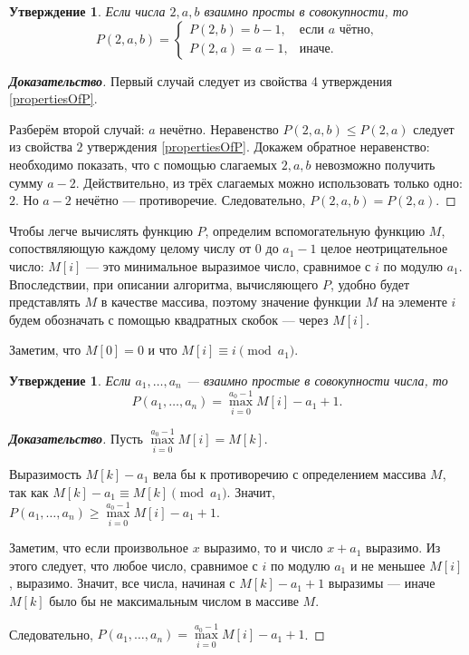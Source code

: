 \documentclass[12pt]{article}
\newtheorem{proposition}[theorem]{Утверждение}
\begin{document}
\begin{proposition}
Если числа $2, a, b$ взаимно просты в совокупности, то \begin{equation*}
P(2, a, b) = \begin{cases}
P(2, b) = b - 1, &\text{если $a$ чётно,} \\
P(2, a) = a - 1,&\text{иначе.}
\end{cases}
\end{equation*}

\end{proposition}
\begin{proof}[\textbf{Доказательство}]
Первый случай следует из свойства 4 утверждения \ref{propertiesOfP}.

Разберём второй случай: $a$ нечётно. Неравенство $P(2, a, b) \le P(2, a)$ следует из свойства $2$ утверждения \ref{propertiesOfP}. Докажем обратное неравенство: необходимо показать, что с помощью слагаемых $2, a, b$ невозможно получить сумму $a - 2$. Действительно, из трёх слагаемых можно использовать только одно: $2$. Но $a - 2$ нечётно --- противоречие. Следовательно, $P(2, a, b) = P(2, a)$.
\end{proof}

Чтобы легче вычислять функцию $P$, определим вспомогательную функцию $M$, сопоствяляющую каждому целому числу от $0$ до $a_1 - 1$ целое неотрицательное число: $M[i]$ --- это минимальное выразимое число, сравнимое с $i$ по модулю $a_1$. Впоследствии, при описании алгоритма, вычисляющего $P$, удобно будет представлять $M$ в качестве массива, поэтому значение функции $M$ на элементе $i$ будем обозначать с помощью квадратных скобок --- через $M[i]$.

Заметим, что $M[0] = 0$ и что $M[i] \equiv i \pmod {a_1}$.

\begin{proposition}
\label{algorithm:lemma1}
Если $a_1, \dots, a_n$ --- взаимно простые в совокупности числа, то \begin{equation*}
P(a_1, \dots, a_n) = \max\limits_{i = 0}^{a_0 - 1} M[i] - a_1 + 1.
\end{equation*}
\end{proposition}
\begin{proof}[\textbf{Доказательство}]
Пусть $\max\limits_{i = 0}^{a_0 - 1} M[i] = M[k]$.

Выразимость $M[k] - a_1$ вела бы к противоречию с определением массива $M$, так как $M[k] - a_1 \equiv M[k] \pmod {a_1}$. Значит, $P(a_1, \dots, a_n) \ge \max\limits_{i = 0}^{a_0 - 1} M[i] - a_1 + 1$.

Заметим, что если произвольное $x$ выразимо, то и число $x + a_1$ выразимо. Из этого следует, что любое число, сравнимое с $i$ по модулю $a_1$ и не меньшее $M[i]$, выразимо. Значит, все числа, начиная с $M[k] - a_1 + 1$ выразимы --- иначе $M[k]$ было бы не максимальным числом в массиве $M$.

Следовательно, $P(a_1, \dots, a_n) = \max\limits_{i = 0}^{a_0 - 1} M[i] - a_1 + 1$.
\end{proof}
\end{document}
